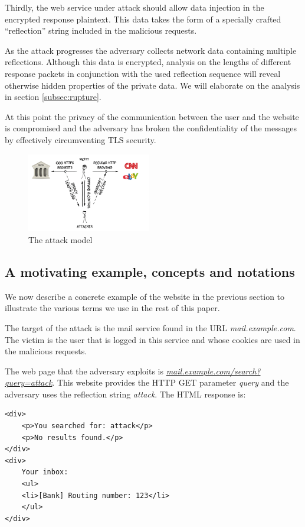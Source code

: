 Thirdly, the web service under attack should allow data injection in the
encrypted response plaintext. This data takes the form of a specially crafted
``reflection'' string included in the malicious requests.

As the attack progresses the adversary collects network data containing multiple
reflections. Although this data is encrypted, analysis on the lengths of
different response packets in conjunction with the used reflection sequence will
reveal otherwise hidden properties of the private data. We will elaborate on the
analysis in section \ref{subsec:rupture}.

At this point the privacy of the communication between the user and the website
is compromised and the adversary has broken the confidentiality of the messages
by effectively circumventing TLS security.

    \begin{figure}[thpb]
        \centering
            \includegraphics[width=0.48\textwidth]{figures/attack_model.png}
        \caption{The attack model}
        \label{fig:attack_model}
    \end{figure}

\subsection{A motivating example, concepts and notations}\label{subsec:terms}
We now describe a concrete example of the website in the previous section to
illustrate the various terms we use in the rest of this paper.

The target of the attack is the mail service found in the URL
\textit{mail.example.com}. The victim is the user that is logged in this service
and whose cookies are used in the malicious requests.

The web page that the adversary exploits is
\textit{\url{mail.example.com/search?query=attack}}. This website provides the HTTP
GET parameter \textit{query} and the adversary uses the reflection string
\textit{attack}. The HTML response is:

\begin{lstlisting}[basicstyle=\small\ttfamily]
<div>
    <p>You searched for: attack</p>
    <p>No results found.</p>
</div>
<div>
    Your inbox:
    <ul>
    <li>[Bank] Routing number: 123</li>
    </ul>
</div>
\end{lstlisting}

